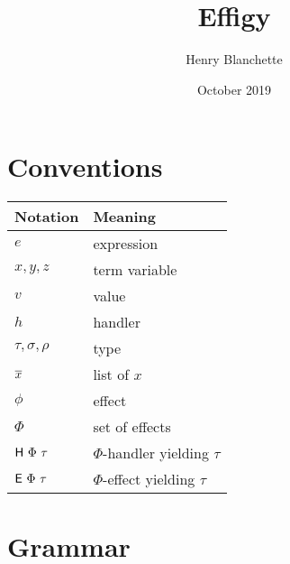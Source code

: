 \documentclass{article}
\title{Effigy}
\author{Henry Blanchette}
\date{October 2019}
\begin{document}
\maketitle

\section{Conventions}

\begin{center} \begin{tabular}{l|l}
  Notation               & Meaning                        \\ \hline
  $e$                    & expression                     \\
  $x, y, z$              & term variable                  \\
  $v$                    & value                          \\
  $h$                    & handler                        \\
  $\tau, \sigma, \rho$   & type                           \\
  $\overline{x}$             & list of $x$                    \\
  $\phi$                 & effect                         \\
  $\Phi$                 & set of effects                 \\
  $\textsf{H} ~ \Phi ~ \tau$ & $\Phi$-handler yielding $\tau$ \\
  $\textsf{E} ~ \Phi ~ \tau$  & $\Phi$-effect yielding $\tau$
 \end{tabular} \end{center}

\newpage
\section{Grammar}
\end{document}
